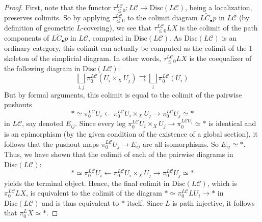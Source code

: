 \begin{proof}
 First, note that the functor $\tau_{\leq 0}^{L\mathcal{C}}: L\mathcal{C}\to \mathrm{Disc}(L\mathcal{C})$, being a localization, preserves colimits. So by applying $\tau_{\leq 0}^{L\mathcal{C}}$ to the colimit diagram $L\check{C}_\bullet p$ in $L\mathcal{C}$ (by definition of geometric $L$-covering), we see that $\tau_{\leq 0}^{L\mathcal{C}}LX$ is the colimit of the path components of $L\check{C}_\bullet p$ in $L\mathcal{C}$, computed in $\mathrm{Disc}(L\mathcal{C})$. As $\mathrm{Disc}(L\mathcal{C})$ is an ordinary category, this colimit can actually be computed as the colimit of the 1-skeleton of the simplicial diagram. In other words, $\tau_{\leq 0}^{L\mathcal{C}}LX$ is the coequalizer of the following diagram in $\mathrm{Disc}(L\mathcal{C})$:
$$\underset{i,j}{\bigsqcup} \pi_0^{L\mathcal{C}}({U_i\times_XU_j})\rightrightarrows \underset{i}{\bigsqcup}\pi_0^{L\mathcal{C}}({U_i})$$
But by formal arguments, this colimit is equal to the colimit of the pairwise pushouts  $$*\simeq\pi_0^{L\mathcal{C}}U_i\leftarrow \pi_0^{L\mathcal{C}}U_i\times_XU_j\to \pi_0^{L\mathcal{C}}U_j\simeq *$$ in $L\mathcal{C}$, say denoted $E_{ij}$. Since every leg $\pi_0^{L\mathcal{C}}U_i\times_XU_j\to \pi_0^{L\mathcal{C}U_i}\simeq *$ is identical and is an epimorphism (by the given condition of the existence of a global section), it follows that the pushout maps $\pi_0^{L\mathcal{C}}U_j\to E_{ij}$ are all isomorphisms. So $E_{ij}\simeq *$. Thus, we have shown that the colimit of each of the pairwise diagrams in $\mathrm{Disc}(L\mathcal{C})$:
$$*\simeq\pi_0^{L\mathcal{C}}U_i\leftarrow \pi_0^{L\mathcal{C}}U_i\times_XU_j\to \pi_0^{L\mathcal{C}}U_j\simeq *$$
yields the terminal object. Hence, the final colimit in $\mathrm{Disc}(L\mathcal{C})$, which is $\pi_0^{L\mathcal{C}}LX$, is equivalent to the colimit of the diagram $*\simeq \pi_0^{L\mathcal{C}}LU_i\to *$ in $\mathrm{Disc}(L\mathcal{C})$ and is thus equivalent to $*$ itself. Since $L$ is path injective, it follows that $\pi_0^LX\simeq*$.
\end{proof}

